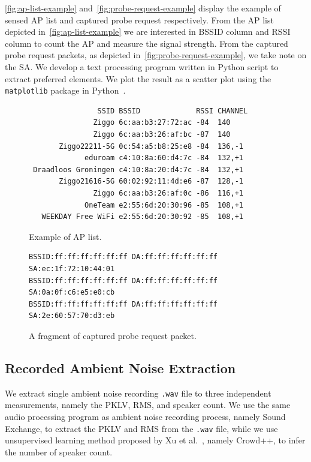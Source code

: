 \autoref{fig:ap-list-example} and~\autoref{fig:probe-request-example} display the example of sensed \ac{AP} list and captured probe request respectively. From the \ac{AP} list depicted in~\autoref{fig:ap-list-example} we are interested in \ac{BSSID} column and \ac{RSSI} column to count the \ac{AP} and measure the signal strength. From the captured probe request packets, as depicted in~\autoref{fig:probe-request-example}, we take note on the \ac{SA}. We develop a text processing program written in Python script to extract preferred elements. We plot the result as a scatter plot using the \verb|matplotlib| package in Python~\cite{Hunter:2007}.

\begin{figure}[ht]
	\centering
\begin{verbatim}
                SSID BSSID             RSSI CHANNEL 
               Ziggo 6c:aa:b3:27:72:ac -84  140     
               Ziggo 6c:aa:b3:26:af:bc -87  140     
       Ziggo22211-5G 0c:54:a5:b8:25:e8 -84  136,-1  
             eduroam c4:10:8a:60:d4:7c -84  132,+1  
 Draadloos Groningen c4:10:8a:20:d4:7c -84  132,+1  
       Ziggo21616-5G 60:02:92:11:4d:e6 -87  128,-1  
               Ziggo 6c:aa:b3:26:af:0c -86  116,+1  
             OneTeam e2:55:6d:20:30:96 -85  108,+1  
   WEEKDAY Free WiFi e2:55:6d:20:30:92 -85  108,+1  
\end{verbatim}
	\caption{Example of \ac{AP} list.}
	\label{fig:ap-list-example}
\end{figure}

\begin{figure}[ht]
\centering
\begin{verbatim}
BSSID:ff:ff:ff:ff:ff:ff DA:ff:ff:ff:ff:ff:ff SA:ec:1f:72:10:44:01
BSSID:ff:ff:ff:ff:ff:ff DA:ff:ff:ff:ff:ff:ff SA:0a:0f:c6:e5:e0:cb
BSSID:ff:ff:ff:ff:ff:ff DA:ff:ff:ff:ff:ff:ff SA:2e:60:57:70:d3:eb
\end{verbatim}
\caption{A fragment of captured probe request packet.}
\label{fig:probe-request-example}
\end{figure}

\subsection{Recorded Ambient Noise Extraction} %
\label{sub:recorded_ambient_noise_extraction}
We extract single ambient noise recording \verb|.wav| file to three independent measurements, namely the \ac{PKLV}, \ac{RMS}, and speaker count. We use the same audio processing program as ambient noise recording process, namely Sound Exchange, to extract the \ac{PKLV} and \ac{RMS} from the \verb|.wav| file, while we use unsupervised learning method proposed by Xu et al.~\cite{thesis067}, namely Crowd++, to infer the number of speaker count.


